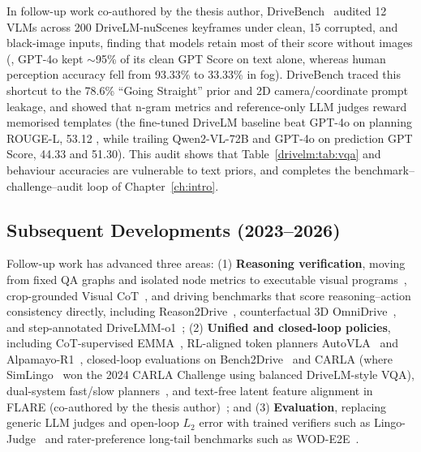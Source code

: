 In follow-up work co-authored by the thesis author, DriveBench~\cite{xie2025vlms} audited 12 VLMs across 200 DriveLM-nuScenes keyframes under clean, 15 corrupted, and black-image inputs, finding that models retain most of their score without images (\eg, GPT-4o kept $\sim$95\% of its clean GPT Score on text alone, whereas human perception accuracy fell from 93.33\% to 33.33\% in fog). DriveBench traced this shortcut to the 78.6\% ``Going Straight'' prior and 2D camera/coordinate prompt leakage, and showed that n-gram metrics and reference-only LLM judges reward memorised templates (the fine-tuned DriveLM baseline beat GPT-4o on planning ROUGE-L, 53.12 , while trailing Qwen2-VL-72B and GPT-4o on prediction GPT Score, 44.33  and 51.30). This audit shows that Table~\ref{drivelm:tab:vqa} and behaviour accuracies are vulnerable to text priors, and completes the benchmark--challenge--audit loop of Chapter~\ref{ch:intro}.

\subsection{Subsequent Developments (2023--2026)}\label{drivelm:sec:subsequent}

Follow-up work has advanced three areas: (1) \textbf{Reasoning verification}, moving from fixed QA graphs and isolated node metrics to executable visual programs~\cite{gupta2023visprog,suris2023vipergpt}, crop-grounded Visual CoT~\cite{shao2024visualcot}, and driving benchmarks that score reasoning--action consistency directly, including Reason2Drive~\cite{nie2024reason2drive}, counterfactual 3D OmniDrive~\cite{wang2025omnidrive}, and step-annotated DriveLMM-o1~\cite{ishaq2025drivelmmo1}; (2) \textbf{Unified and closed-loop policies}, including CoT-supervised EMMA~\cite{hwang2025emma}, RL-aligned token planners AutoVLA~\cite{zhou2025autovla} and Alpamayo-R1~\cite{nvidia2025alpamayo}, closed-loop evaluations on Bench2Drive~\cite{jia2024bench2drive,fu2025orion} and CARLA (where SimLingo~\cite{renz2025simlingo} won the 2024 CARLA Challenge using balanced DriveLM-style VQA), dual-system fast/slow planners~\cite{tian2024drivevlm,jiang2026senna,hamdan2025eta}, and text-free latent feature alignment in FLARE (co-authored by the thesis author)~\cite{xie2026flare}; and (3) \textbf{Evaluation}, replacing generic LLM judges and open-loop $L_2$ error with trained verifiers such as Lingo-Judge~\cite{marcu2024lingoqa} and rater-preference long-tail benchmarks such as WOD-E2E~\cite{xu2026wode2e}.

